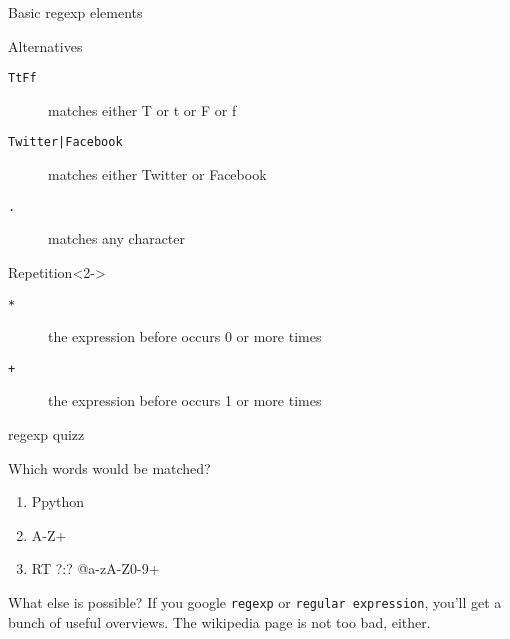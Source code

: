 \documentclass{beamer}
\begin{document}
\begin{frame}{Basic regexp elements}
\begin{block}{Alternatives}
\begin{description}
\item[{\tt{\lbrack TtFf\rbrack}}] matches either T or t or F or f
\item[{\tt{Twitter|Facebook}}] matches either Twitter or Facebook
\item[{\tt{.}}] matches any character
\end{description}
\end{block}
\begin{block}{Repetition}<2->
\begin{description}
\item[{\tt{*}}] the expression before occurs 0 or more times
\item[{\tt{+}}] the expression before occurs 1 or more times
\end{description}
\end{block}
\end{frame}

\begin{frame}{regexp quizz}
\begin{block}{Which words would be matched?}
\tt
\begin{enumerate}
\item<1-> \lbrack Pp\rbrack ython
\item<2-> \lbrack A-Z\rbrack +
\item<3-> RT ?:? @\lbrack a-zA-Z0-9\rbrack +
\end{enumerate}
\end{block}
\end{frame}

\begin{frame}{What else is possible?}
If you google {\tt{regexp}} or {\tt{regular expression}}, you'll get a bunch of useful overviews. The wikipedia page is not too bad, either. 
\end{frame}
\end{document}
